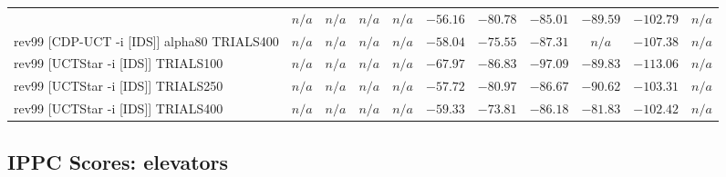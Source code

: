 \documentclass{article}
\begin{document}
\begin{tabular}{|l|r@{$\pm$}rr@{$\pm$}rr@{$\pm$}rr@{$\pm$}rr@{$\pm$}rr@{$\pm$}rr@{$\pm$}rr@{$\pm$}rr@{$\pm$}rr@{$\pm$}r|}
& \multicolumn{2}{c}{\textbf{$n/a$}}
& \multicolumn{2}{c}{\textbf{$n/a$}}
& \multicolumn{2}{c}{\textbf{$n/a$}}
& \multicolumn{2}{c}{\textbf{$n/a$}}
& \multicolumn{2}{c}{$-56.16$}
& \multicolumn{2}{c}{$-80.78$}
& \multicolumn{2}{c}{$-85.01$}
& \multicolumn{2}{c}{$-89.59$}
& \multicolumn{2}{c}{$-102.79$}
& \multicolumn{2}{c|}{\textbf{$n/a$}}
\\
rev99 [CDP-UCT -i [IDS]] alpha80 TRIALS400
& \multicolumn{2}{c}{\textbf{$n/a$}}
& \multicolumn{2}{c}{\textbf{$n/a$}}
& \multicolumn{2}{c}{\textbf{$n/a$}}
& \multicolumn{2}{c}{\textbf{$n/a$}}
& \multicolumn{2}{c}{$-58.04$}
& \multicolumn{2}{c}{$-75.55$}
& \multicolumn{2}{c}{$-87.31$}
& \multicolumn{2}{c}{\textbf{$n/a$}}
& \multicolumn{2}{c}{$-107.38$}
& \multicolumn{2}{c|}{\textbf{$n/a$}}
\\
rev99 [UCTStar -i [IDS]] TRIALS100
& \multicolumn{2}{c}{\textbf{$n/a$}}
& \multicolumn{2}{c}{\textbf{$n/a$}}
& \multicolumn{2}{c}{\textbf{$n/a$}}
& \multicolumn{2}{c}{\textbf{$n/a$}}
& \multicolumn{2}{c}{$-67.97$}
& \multicolumn{2}{c}{$-86.83$}
& \multicolumn{2}{c}{$-97.09$}
& \multicolumn{2}{c}{$-89.83$}
& \multicolumn{2}{c}{$-113.06$}
& \multicolumn{2}{c|}{\textbf{$n/a$}}
\\
rev99 [UCTStar -i [IDS]] TRIALS250
& \multicolumn{2}{c}{\textbf{$n/a$}}
& \multicolumn{2}{c}{\textbf{$n/a$}}
& \multicolumn{2}{c}{\textbf{$n/a$}}
& \multicolumn{2}{c}{\textbf{$n/a$}}
& \multicolumn{2}{c}{$-57.72$}
& \multicolumn{2}{c}{$-80.97$}
& \multicolumn{2}{c}{$-86.67$}
& \multicolumn{2}{c}{$-90.62$}
& \multicolumn{2}{c}{$-103.31$}
& \multicolumn{2}{c|}{\textbf{$n/a$}}
\\
rev99 [UCTStar -i [IDS]] TRIALS400
& \multicolumn{2}{c}{\textbf{$n/a$}}
& \multicolumn{2}{c}{\textbf{$n/a$}}
& \multicolumn{2}{c}{\textbf{$n/a$}}
& \multicolumn{2}{c}{\textbf{$n/a$}}
& \multicolumn{2}{c}{$-59.33$}
& \multicolumn{2}{c}{$-73.81$}
& \multicolumn{2}{c}{$-86.18$}
& \multicolumn{2}{c}{$-81.83$}
& \multicolumn{2}{c}{$-102.42$}
& \multicolumn{2}{c|}{\textbf{$n/a$}}
\\
\hline
\end{tabular}%

\bigskip

\subsection*{IPPC Scores: elevators}
\end{document}
